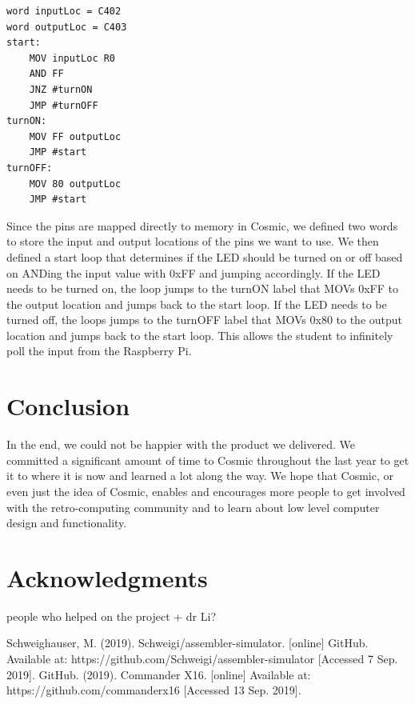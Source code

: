 \documentclass[conference]{IEEEtran}
\begin{document}
\begin{lstlisting}[caption={Cosmic assembly to interface with a Raspberry Pi.}, label = {lab3}]
word inputLoc = C402
word outputLoc = C403
start:
	MOV inputLoc R0
    AND FF
	JNZ #turnON
    JMP #turnOFF
turnON:
	MOV FF outputLoc
    JMP #start
turnOFF:
	MOV 80 outputLoc
	JMP #start
\end{lstlisting}

Since the pins are mapped directly to memory in Cosmic, we defined two words to store the input and output locations of the pins we want to use. We then defined a start loop that determines if the LED should be turned on or off based on ANDing the input value with 0xFF and jumping accordingly. If the LED needs to be turned on, the loop jumps to the turnON label that MOVs 0xFF to the output location and jumps back to the start loop. If the LED needs to be turned off, the loops jumps to the turnOFF label that MOVs 0x80 to the output location and jumps back to the start loop. This allows the student to infinitely poll the input from the Raspberry Pi.


\section{Conclusion}
In the end, we could not be happier with the product we delivered. We committed a significant amount of time to Cosmic throughout the last year to get it to where it is now and learned a lot along the way. We hope that Cosmic, or even just the idea of Cosmic, enables and encourages more people to get involved with the retro-computing community and to learn about low level computer design and functionality.


\section{Acknowledgments}
people who helped on the project + dr Li?


\begin{thebibliography}{00}
 Schweighauser, M. (2019). Schweigi/assembler-simulator. [online] GitHub. Available at: https://github.com/Schweigi/assembler-simulator [Accessed 7 Sep. 2019].
GitHub. (2019). Commander X16. [online] Available at: https://github.com/commanderx16 [Accessed 13 Sep. 2019].
\end{thebibliography}
\end{document}
